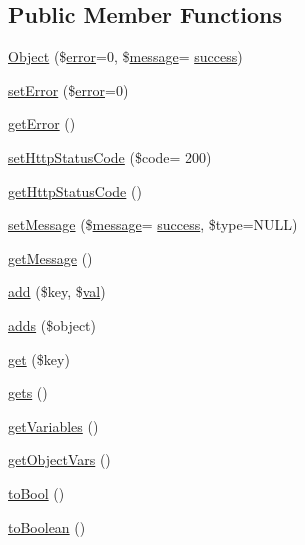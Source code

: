\subsection*{Public Member Functions}
\begin{DoxyCompactItemize}
\item 
\hyperlink{classObject_a9c1f4bf33208a5c858c0722afce90f30}{Object} (\$\hyperlink{jquery_8js_ad9c7b7332a24ed93fb21cd053c99bd12}{error}=0, \$\hyperlink{classmessage}{message}= \textquotesingle{}\hyperlink{jquery_8oembed_8js_a20d50bae920793dd76c2f5b4c6fd9803}{success}\textquotesingle{})
\item 
\hyperlink{classObject_a12f7ac70214558a1774ca010865c798e}{set\+Error} (\$\hyperlink{jquery_8js_ad9c7b7332a24ed93fb21cd053c99bd12}{error}=0)
\item 
\hyperlink{classObject_a2aaced460a018edd69bf17813d6c48df}{get\+Error} ()
\item 
\hyperlink{classObject_a56a37e14694356404f793dd0ab02e2af}{set\+Http\+Status\+Code} (\$code= \textquotesingle{}200\textquotesingle{})
\item 
\hyperlink{classObject_a5cb4abc24dd01e04c24da487d476efc0}{get\+Http\+Status\+Code} ()
\item 
\hyperlink{classObject_a28eb2a0ea4a14ff617d78505c38c906c}{set\+Message} (\$\hyperlink{classmessage}{message}= \textquotesingle{}\hyperlink{jquery_8oembed_8js_a20d50bae920793dd76c2f5b4c6fd9803}{success}\textquotesingle{}, \$type=N\+U\+LL)
\item 
\hyperlink{classObject_a813487b153bfe18102ac76d8c718999f}{get\+Message} ()
\item 
\hyperlink{classObject_a4f8a7fa8794663b7625fc15c9589797b}{add} (\$key, \$\hyperlink{ckeditor_2js_2xe__interface_8js_a4fb96abdf073a439bca5e051c333b35d}{val})
\item 
\hyperlink{classObject_a6dbae38facc1000561b8b230847aaca1}{adds} (\$object)
\item 
\hyperlink{classObject_ae6dff49b7ab68822bdb4ce6940c10d3f}{get} (\$key)
\item 
\hyperlink{classObject_ad6f51071a4048c1fed581748065e4d68}{gets} ()
\item 
\hyperlink{classObject_ad33c509ec041fb43c6e25f8155577925}{get\+Variables} ()
\item 
\hyperlink{classObject_afe1fe6fc005389cd616a5e9105de977a}{get\+Object\+Vars} ()
\item 
\hyperlink{classObject_a409216fd5ab386b1e78e311440113f75}{to\+Bool} ()
\item 
\hyperlink{classObject_afafb45098e163c179940c7e1ddc67fe2}{to\+Boolean} ()
\end{DoxyCompactItemize}
